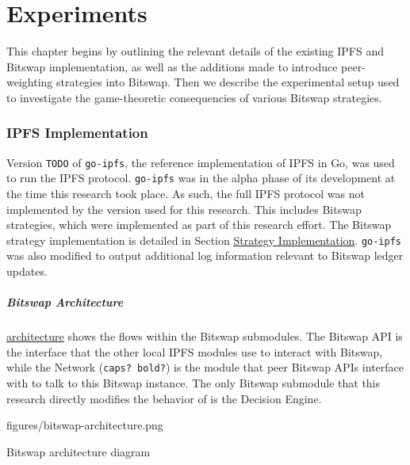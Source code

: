 \hypertarget{experiments}{%
\chapter{Experiments}\label{chapter:experiments}}

This chapter begins by outlining the relevant details of the existing IPFS
and Bitswap implementation, as well as the additions made to introduce
peer-weighting strategies into Bitswap. Then we describe the experimental
setup used to investigate the game-theoretic consequencies of various Bitswap
strategies.

\hypertarget{ipfs-implementation}{%
\subsection{IPFS Implementation}\label{ipfs-implementation}}

Version \texttt{TODO} of \texttt{go-ipfs}, the reference implementation
of IPFS in Go, was used to run the IPFS protocol. \texttt{go-ipfs} was
in the alpha phase of its development at the time this research took
place. As such, the full IPFS protocol was not implemented by the
version used for this research. This includes Bitswap strategies, which
were implemented as part of this research effort. The Bitswap strategy
implementation is detailed in Section
\protect\hyperlink{strategy-implementation}{Strategy Implementation}.
\texttt{go-ipfs} was also modified to output additional log information
relevant to Bitswap ledger updates.

\hypertarget{bitswap-architecture}{%
\paragraph{Bitswap Architecture}\label{bitswap-architecture}}

\href{}{architecture} shows the flows within the Bitswap submodules. The
Bitswap API is the interface that the other local IPFS modules use to
interact with Bitswap, while the Network (\texttt{caps?\ bold?}) is the
module that peer Bitswap APIs interface with to talk to this Bitswap
instance. The only Bitswap submodule that this research directly
modifies the behavior of is the Decision Engine.

\leavevmode{}%
figures/bitswap-architecture.png

Bitswap architecture diagram

